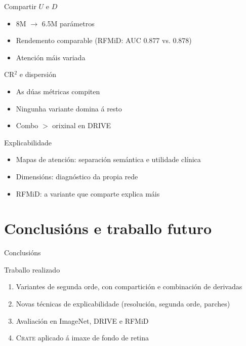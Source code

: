 \documentclass{beamer}
\newcommand{\done}{\rlap{\raisebox{0.3ex}{\hspace{0.4ex}\tiny \ding{52}}}$\square$}
\begin{document}
\begin{frame}{Compartir $U$ e $D$}
    \begin{block}{}
        \begin{itemize}
            \item 8M $\rightarrow$ 6.5M parámetros \pause
            \item Rendemento comparable (RFMiD: AUC 0.877 vs. 0.878) \pause
            \item Atención máis variada
        \end{itemize}
    \end{block}
\end{frame}

\begin{frame}{CR$^2$ e dispersión}
    \begin{block}{}
        \begin{itemize}
            \item As dúas métricas compiten \pause
            \item Ningunha variante domina á resto \pause
            \item Combo $>$ orixinal en DRIVE
        \end{itemize}
    \end{block}
\end{frame}

\begin{frame}{Explicabilidade}
    \begin{block}{}
        \begin{itemize}
            \item Mapas de atención: separación semántica e utilidade clínica \pause
            \item Dimensións: diagnóstico da propia rede \pause
            \item RFMiD: a variante que comparte explica máis
        \end{itemize}
    \end{block}
\end{frame}


\section{Conclusións e traballo futuro}

\begin{frame}{Conclusións}
    \begin{block}{Traballo realizado}
        \begin{enumerate}
            \item[\done] Variantes de segunda orde, con compartición e combinación de derivadas \pause
            \item[\done] Novas técnicas de explicabilidade (resolución, segunda orde, parches) \pause
            \item[\done] Avaliación en ImageNet, DRIVE e RFMiD \pause
            \item[\done] \textsc{Crate} aplicado á imaxe de fondo de retina
        \end{enumerate}
    \end{block}
\end{frame}
\end{document}
